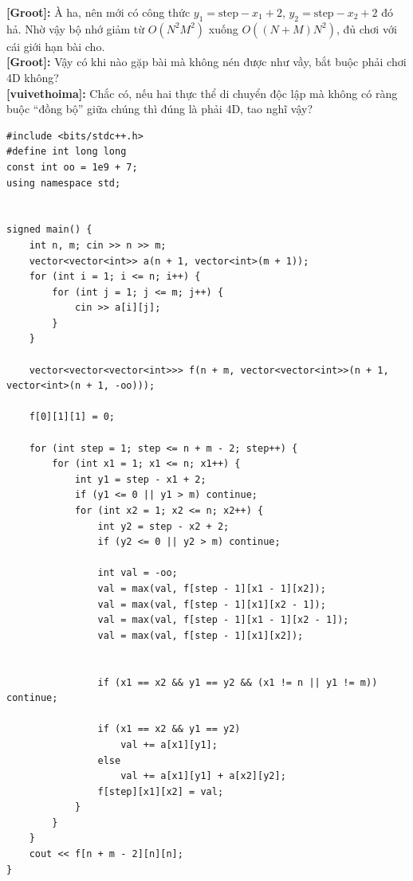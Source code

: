 \textbf{[Groot]:} À ha, nên mới có công thức $y_1 = \text{step} - x_1 + 2$,  
$y_2 = \text{step} - x_2 + 2$ đó hả. Nhờ vậy bộ nhớ giảm từ $O(N^2M^2)$ xuống $O((N+M)N^2)$, đủ chơi với cái giới hạn bài cho.\\

\textbf{[Groot]:} Vậy có khi nào gặp bài mà không nén được như vầy, bắt buộc phải chơi 4D không?\\

\textbf{[vuivethoima]:} Chắc có, nếu hai thực thể di chuyển độc lập mà không có ràng buộc ``đồng bộ'' giữa chúng thì đúng là phải 4D, tao nghĩ vậy? 

\begin{lstlisting}[title=\centering\textbf{Cài đặt}]
#include <bits/stdc++.h>
#define int long long
const int oo = 1e9 + 7;
using namespace std;


signed main() {
    int n, m; cin >> n >> m;
    vector<vector<int>> a(n + 1, vector<int>(m + 1));
    for (int i = 1; i <= n; i++) {
        for (int j = 1; j <= m; j++) {
            cin >> a[i][j];
        }
    }

    vector<vector<vector<int>>> f(n + m, vector<vector<int>>(n + 1, vector<int>(n + 1, -oo)));

    f[0][1][1] = 0;

    for (int step = 1; step <= n + m - 2; step++) {
        for (int x1 = 1; x1 <= n; x1++) {
            int y1 = step - x1 + 2;
            if (y1 <= 0 || y1 > m) continue;
            for (int x2 = 1; x2 <= n; x2++) {
                int y2 = step - x2 + 2;
                if (y2 <= 0 || y2 > m) continue;

                int val = -oo;
                val = max(val, f[step - 1][x1 - 1][x2]);
                val = max(val, f[step - 1][x1][x2 - 1]);
                val = max(val, f[step - 1][x1 - 1][x2 - 1]);
                val = max(val, f[step - 1][x1][x2]); 


                if (x1 == x2 && y1 == y2 && (x1 != n || y1 != m)) continue;

                if (x1 == x2 && y1 == y2)
                    val += a[x1][y1];
                else
                    val += a[x1][y1] + a[x2][y2];
                f[step][x1][x2] = val;
            }
        }
    }
    cout << f[n + m - 2][n][n];
}
\end{lstlisting}

